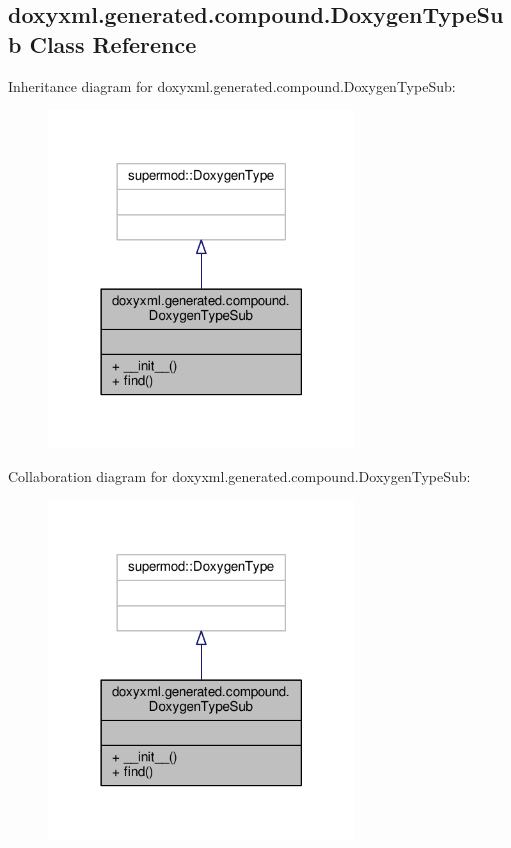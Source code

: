\subsection{doxyxml.\+generated.\+compound.\+Doxygen\+Type\+Sub Class Reference}
\label{classdoxyxml_1_1generated_1_1compound_1_1DoxygenTypeSub}


Inheritance diagram for doxyxml.\+generated.\+compound.\+Doxygen\+Type\+Sub\+:
\nopagebreak
\begin{figure}[H]
\begin{center}
\leavevmode
\includegraphics[width=230pt]{d1/d02/classdoxyxml_1_1generated_1_1compound_1_1DoxygenTypeSub__inherit__graph}
\end{center}
\end{figure}


Collaboration diagram for doxyxml.\+generated.\+compound.\+Doxygen\+Type\+Sub\+:
\nopagebreak
\begin{figure}[H]
\begin{center}
\leavevmode
\includegraphics[width=230pt]{da/d88/classdoxyxml_1_1generated_1_1compound_1_1DoxygenTypeSub__coll__graph}
\end{center}
\end{figure}
